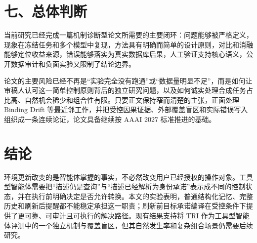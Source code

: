 \documentclass[10.5pt,fontset=none]{ctexart}
\begin{document}
\section{七、总体判断}
\par 当前研究已经完成一篇机制诊断型论文所需要的主要闭环：问题能够被严格定义，现象在冻结任务和多个模型中复现，方法具有明确而简单的设计原则，对比和消融能够定位收益来源，错误能够落实为真实数据库后果，人工验证支持核心语义，公开数据审计和负面实验又限制了结论边界。
\par 论文的主要风险已经不再是“实验完全没有跑通”或“数据量明显不足”，而是如何让审稿人认可这一简单控制原则背后的独立研究问题，以及如何诚实处理合成任务占比高、自然机会稀少和组合性有限。只要正文保持窄而清楚的主张，正面处理 Binding Drift 等最近邻工作，并把受控因果证据、外部覆盖盲区和实际错误写入组织成一条连续论证，论文具备继续按 AAAI 2027 标准推进的基础。
\section{结论}
\par 环境更新改变的是智能体掌握的事实，不必然改变用户已经授权的操作对象。工具型智能体需要把“描述仍是查询”与“描述已经解析为身份承诺”表示成不同的控制状态，并在执行前明确决定是否允许转换。本文的实验表明，普通结构化记忆、完整历史和刷新后提醒都不能稳定承担这一职责；刷新前目标承诺编译在受控条件下提供了更可靠、可审计且可执行的解决路径。现有结果支持将 TRI 作为工具型智能体评测中的一个独立机制与覆盖盲区，但其自然发生率和复杂组合场景仍需要后续研究。
\end{document}

